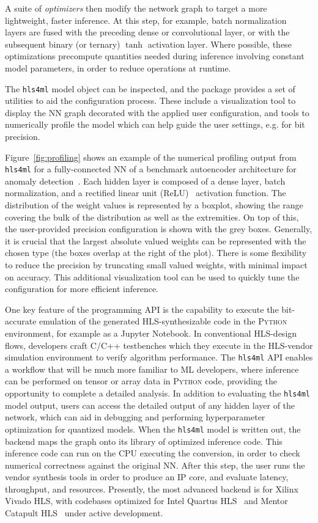 \documentclass[tinyml]{acmart}
\newcommand{\hlsfml}{\texttt{hls4ml}\xspace}
\begin{document}
A suite of \textit{optimizers} then modify the network graph to target a more lightweight, faster inference.
At this step, for example, batch normalization~\cite{bn} layers are fused with the preceding dense or convolutional layer, or with the subsequent binary (or ternary) $\tanh$ activation layer.
Where possible, these optimizations precompute quantities needed during inference involving constant model parameters, in order to reduce operations at runtime.

The \hlsfml model object can be inspected, and the package provides a set of utilities to aid the configuration process.
These include a visualization tool to display the NN graph decorated with the applied user configuration, and tools to numerically profile the model which can help guide the user settings, e.g. for bit precision.

Figure~\ref{fig:profiling} shows an example of the numerical profiling output from \hlsfml for a fully-connected NN of a benchmark autoencoder architecture for anomaly detection~\cite{tinyml}.
Each hidden layer is composed of a dense layer, batch normalization, and a rectified linear unit (ReLU)~\cite{relu1,relu2} activation function.
The distribution of the weight values is represented by a boxplot, showing the range covering the bulk of the distribution as well as the extremities.
On top of this, the user-provided precision configuration is shown with the grey boxes.
Generally, it is crucial that the largest absolute valued weights can be represented with the chosen type (the boxes overlap at the right of the plot).
There is some flexibility to reduce the precision by truncating small valued weights, with minimal impact on accuracy.
This additional visualization tool can be used to quickly tune the configuration for more efficient inference.

One key feature of the programming API is the capability to execute the bit-accurate emulation of the generated HLS-synthesizable code in the \textsc{Python} environment, for example as a Jupyter Notebook.
In conventional HLS-design flows, developers craft \textsc{C/C++} testbenches which they execute in the HLS-vendor simulation environment to verify algorithm performance.
The \hlsfml API enables a workflow that will be much more familiar to ML developers, where inference can be performed on tensor or array data in \textsc{Python} code, providing the opportunity to complete a detailed analysis.
In addition to evaluating the \hlsfml model output, users can access the detailed output of any hidden layer of the network, which can aid in debugging and performing hyperparameter optimization for quantized models.
When the \hlsfml model is written out, the backend maps the graph onto its library of optimized inference code.
This inference code can run on the CPU executing the conversion, in order to check numerical correctness against the original NN.
After this step, the user runs the vendor synthesis tools in order to produce an IP core, and evaluate latency, throughput, and resources.
Presently, the most advanced backend is for Xilinx Vivado HLS, with codebases optimized for Intel Quartus HLS~\cite{quartus2020} and Mentor Catapult HLS~\cite{catapulthls2020} under active development.
\end{document}
